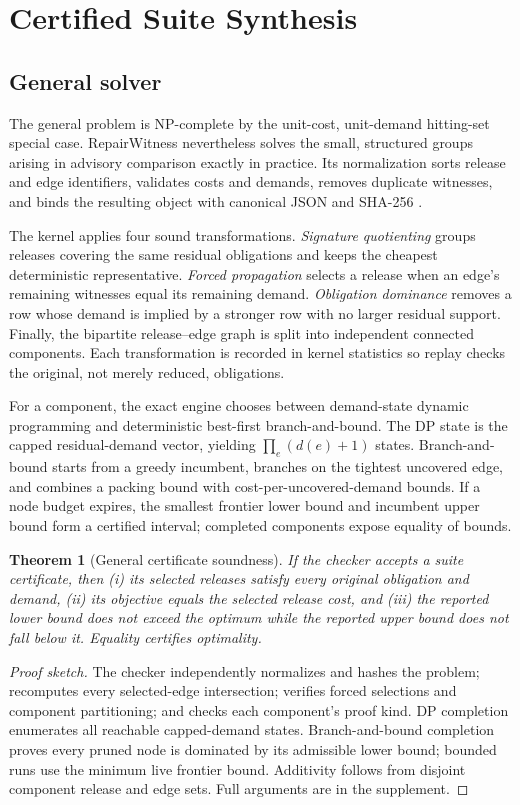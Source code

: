 \documentclass[10pt,conference]{IEEEtran}
\newtheorem{theorem}{Theorem}
\begin{document}
\section{Certified Suite Synthesis}
\subsection{General solver}
The general problem is NP-complete by the unit-cost, unit-demand hitting-set special case. RepairWitness nevertheless solves the small, structured groups arising in advisory comparison exactly in practice. Its normalization sorts release and edge identifiers, validates costs and demands, removes duplicate witnesses, and binds the resulting object with canonical JSON and SHA-256 \cite{rfc8785}.

The kernel applies four sound transformations. \emph{Signature quotienting} groups releases covering the same residual obligations and keeps the cheapest deterministic representative. \emph{Forced propagation} selects a release when an edge's remaining witnesses equal its remaining demand. \emph{Obligation dominance} removes a row whose demand is implied by a stronger row with no larger residual support. Finally, the bipartite release--edge graph is split into independent connected components. Each transformation is recorded in kernel statistics so replay checks the original, not merely reduced, obligations.

For a component, the exact engine chooses between demand-state dynamic programming and deterministic best-first branch-and-bound. The DP state is the capped residual-demand vector, yielding $\prod_e(d(e)+1)$ states. Branch-and-bound starts from a greedy incumbent, branches on the tightest uncovered edge, and combines a packing bound with cost-per-uncovered-demand bounds. If a node budget expires, the smallest frontier lower bound and incumbent upper bound form a certified interval; completed components expose equality of bounds.

\begin{theorem}[General certificate soundness]
If the checker accepts a suite certificate, then (i) its selected releases satisfy every original obligation and demand, (ii) its objective equals the selected release cost, and (iii) the reported lower bound does not exceed the optimum while the reported upper bound does not fall below it. Equality certifies optimality.
\end{theorem}
\begin{proof}[Proof sketch]
The checker independently normalizes and hashes the problem; recomputes every selected-edge intersection; verifies forced selections and component partitioning; and checks each component's proof kind. DP completion enumerates all reachable capped-demand states. Branch-and-bound completion proves every pruned node is dominated by its admissible lower bound; bounded runs use the minimum live frontier bound. Additivity follows from disjoint component release and edge sets. Full arguments are in the supplement.
\end{proof}
\end{document}
